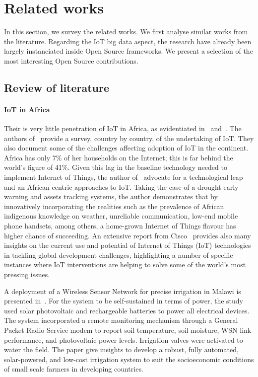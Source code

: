 

\section{Related works}
\label{sec:relworks}

In this section, we survey the related works.
We first analyse similar works from the literature.
Regarding the IoT big data aspect, the research have already been largely instanciated inside Open Source frameworks.
We present a selection of the most interesting Open Source contributions.

\subsection{Review of literature}

\paragraph{IoT in Africa}
Their is very little penetration of IoT in Africa, as evidentiated in~\cite{Onyalo2015} and~\cite{Masinde2014}.
The authors of~\cite{Onyalo2015} provide a survey, country by country, of the undertaking of IoT.
They also document some of the challenges affecting adoption of IoT in the continent.
Africa has only 7\% of her households on the Internet; this is far behind the world’s figure of 41\%.
Given this lag in the baseline technology needed to implement Internet of Things, the author of~\cite{Masinde2014} advocate for a technological leap and an African-centric approaches to IoT.
Taking the case of a drought early warning and assets tracking systems, the author demonstrates that by innovatively incorporating the realities such as the prevalence of African indigenous knowledge on weather, unreliable communication, low-end mobile phone handsets, among others, a home-grown Internet of Things flavour has higher chance of succeeding.
An extensive report from Cisco~\cite{ITU2015} provides also many insights on the current use and potential of Internet of Things (IoT) technologies in tackling global development challenges, highlighting a number of specific instances where IoT interventions are helping to solve some of the world’s most pressing issues.


A deployment of a Wireless Sensor Network for precise irrigation in Malawi is presented in~\cite{Mafuta2013}.
For the system to be self-sustained in terms of power, the study used solar photovoltaic and rechargeable batteries to power all electrical devices.
The system incorporated a remote monitoring mechanism through a General Packet Radio Service modem to report soil temperature, soil moisture, WSN
link performance, and photovoltaic power levels. 
Irrigation valves were activated to water the field.
The paper give insights to develop a robust, fully automated, solar-powered, and low-cost irrigation system to suit the socioeconomic conditions of small scale farmers in developing countries.

